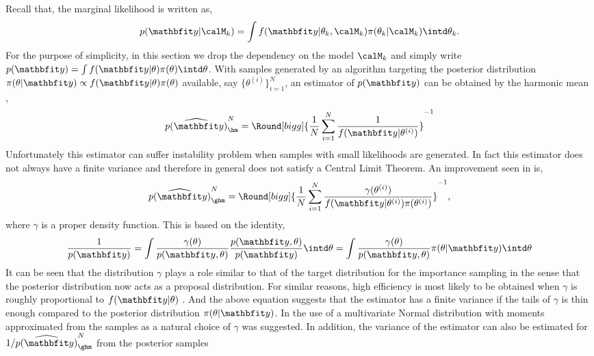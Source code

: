 Recall that, the marginal likelihood is written as,
\begin{equation*}
  p(\data|\calM_k) = \int
  f(\data|\theta_k,\calM_k)\pi(\theta_k|\calM_k)\intd\theta_k.
\end{equation*}
For the purpose of simplicity, in this section we drop the dependency on the
model $\calM_k$ and simply write $p(\data) = \int
f(\data|\theta)\pi(\theta)\intd\theta$. With samples generated by an \mcmc
algorithm targeting the posterior distribution $\pi(\theta|\data) \propto
f(\data|\theta) \pi(\theta)$ available, say $\{\theta^{(i)}\}_{i=1}^N$, an
estimator of $p(\data)$ can be obtained by the harmonic mean
\cite{Newton:1994wm},
\begin{equation}
  \widehat{p(\data)}_{\hm}^N =
  \Round[bigg]{\frac{1}{N}\sum_{i=1}^N\frac{1}{f(\data|\theta^{(i)})}}^{-1}
\end{equation}
Unfortunately this estimator can suffer instability problem when samples with
small likelihoods are generated. In fact this estimator does not always have a
finite variance and therefore in general does not satisfy a Central Limit
Theorem. An improvement seen in \cite{Kass:1995vb} is,
\begin{equation}
  \widehat{p(\data)}_{\ghm}^N = \Round[bigg]{
    \frac{1}{N}\sum_{i=1}^N
    \frac{\gamma(\theta^{(i)})}{f(\data|\theta^{(i)})\pi(\theta^{(i)})}}^{-1},
\end{equation}
where $\gamma$ is a proper density function. This is based on the identity,
\begin{equation}
  \frac{1}{p(\data)}
  = \int \frac{\gamma(\theta)}{p(\data,\theta)}
  \frac{p(\data,\theta)}{p(\data)} \intd \theta
  = \int \frac{\gamma(\theta)}{p(\data,\theta)} \pi(\theta|\data) \intd \theta
\end{equation}
It can be seen that the distribution $\gamma$ plays a role similar to that of
the target distribution for the importance sampling in the sense that the
posterior distribution now acts as a proposal distribution. For similar
reasons, high efficiency is most likely to be obtained when $\gamma$ is
roughly proportional to $f(\data|\theta)$ \cite{Kass:1995vb}. And the above
equation suggests that the estimator has a finite variance if the tails of
$\gamma$ is thin enough compared to the posterior distribution
$\pi(\theta|\data)$. In \cite{Gelfand:1994ux} the use of a multivariate Normal
distribution with moments approximated from the samples as a natural choice of
$\gamma$ was suggested. In addition, the variance of the estimator can also be
estimated for $1/\widehat{p(\data)}_{\ghm}^N$ from the posterior samples
